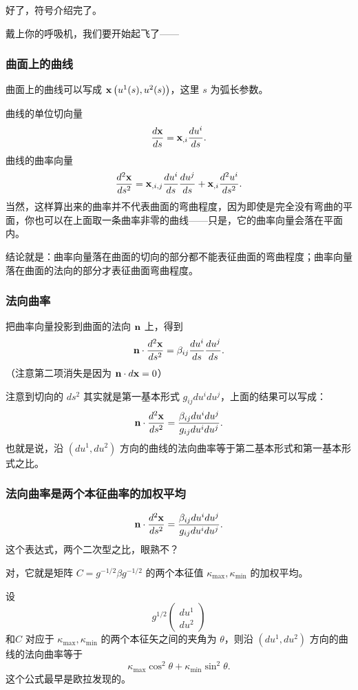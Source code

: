 \documentclass[CJK,13pt]{beamer}
\begin{document}
\begin{frame}
  好了，符号介绍完了。

  \skiplines
  
  戴上你的呼吸机，我们要开始起飞了——
\end{frame}


\begin{frame}
  \frametitle{曲面上的曲线}
  曲面上的曲线可以写成 $ {\mathbf{x}}\left(u^1(s), u^2(s)\right)$，这里 $s$ 为弧长参数。

  \skipline
  
  曲线的单位切向量
  $$\frac{d{\mathbf{x}}}{ds} = {\mathbf{x}}_{,i} \frac{du^i}{ds}. $$
  曲线的曲率向量
  $$\frac{d^2{\mathbf{x}}}{ds^2} = {\mathbf{x}}_{,i,j} \frac{du^i}{ds}\frac{du^j}{ds} + {\mathbf{x}}_{, i} \frac{d^2 u^i}{ds^2}. $$
  当然，这样算出来的曲率并不代表曲面的弯曲程度，因为即使是完全没有弯曲的平面，你也可以在上面取一条曲率非零的曲线——只是，它的曲率向量会落在平面内。

  \skipline

  结论就是：曲率向量落在曲面的切向的部分都不能表征曲面的弯曲程度；曲率向量落在曲面的法向的部分才表征曲面弯曲程度。
  
\end{frame}


\begin{frame}
  \frametitle{法向曲率}
  把曲率向量投影到曲面的法向 ${\mathbf{n}}$ 上，得到
  $$ {\mathbf{n}} \cdot \frac{d^2{\mathbf{x}}}{ds^2} =  \beta_{ij} \frac{du^i}{ds}\frac{du^j}{ds}.$$
  （注意第二项消失是因为 ${\mathbf{n}} \cdot d{\mathbf{x}} = 0$）
  
  注意到切向的 $ds^2$ 其实就是第一基本形式 $g_{ij}du^i du^j$，上面的结果可以写成：
  $$ {\mathbf{n}} \cdot \frac{d^2{\mathbf{x}}}{ds^2} =  \frac{\beta_{ij}du^i du^j}{g_{ij}du^idu^j}.$$
  也就是说，{\blue 沿 $(du^1, du^2)$ 方向的曲线的法向曲率等于第二基本形式和第一基本形式之比。}


\end{frame}


\begin{frame}
  \frametitle{法向曲率是两个本征曲率的加权平均}
  $$ {\mathbf{n}} \cdot \frac{d^2{\mathbf{x}}}{ds^2} =  \frac{\beta_{ij}du^i du^j}{g_{ij}du^idu^j}.$$
  这个表达式，两个二次型之比，眼熟不？

  对，它就是矩阵 $C=g^{-1/2}\beta g^{-1/2}$ 的两个本征值 $\kappa_{\max}, \kappa_{\min}$ 的加权平均。

  设 $$ g^{1/2}\begin{pmatrix}du^1 \\ du^2 \end{pmatrix}$$
  和$C$ 对应于 $\kappa_{\max}, \kappa_{\min}$ 的两个本征矢之间的夹角为 $\theta$，则沿 $(du^1, du^2)$ 方向的曲线的法向曲率等于
  {\blue $$ \kappa_{\max}\cos^2\theta + \kappa_{\min}\sin^2\theta.$$}
  这个公式最早是欧拉发现的。
\end{frame}
\end{document}

